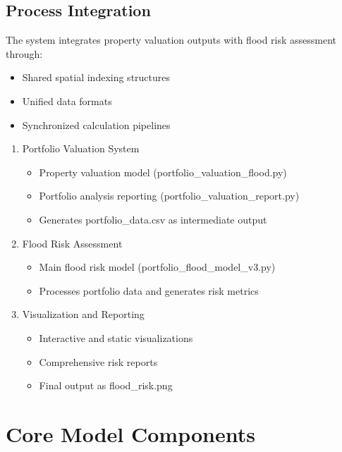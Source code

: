 \documentclass{article}
\begin{document}
\subsection{Process Integration}
The system integrates property valuation outputs with flood risk assessment through:
\begin{itemize}
    \item Shared spatial indexing structures
    \item Unified data formats
    \item Synchronized calculation pipelines
\end{itemize}
\begin{enumerate}
    \item Portfolio Valuation System
    \begin{itemize}
        \item Property valuation model (portfolio\_valuation\_flood.py)
        \item Portfolio analysis reporting (portfolio\_valuation\_report.py)
        \item Generates portfolio\_data.csv as intermediate output
    \end{itemize}
    
    \item Flood Risk Assessment
    \begin{itemize}
        \item Main flood risk model (portfolio\_flood\_model\_v3.py)
        \item Processes portfolio data and generates risk metrics
    \end{itemize}
    
    \item Visualization and Reporting
    \begin{itemize}
        \item Interactive and static visualizations
        \item Comprehensive risk reports
        \item Final output as flood\_risk.png
    \end{itemize}
\end{enumerate}

\section{Core Model Components}
\end{document}
